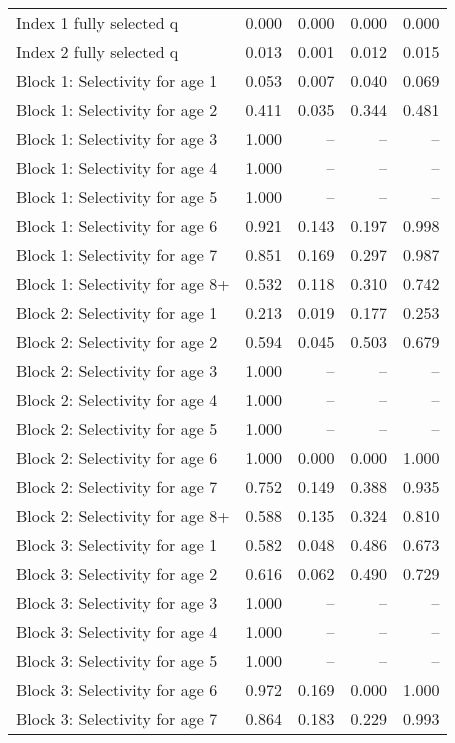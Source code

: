 \documentclass[
]{article}
\begin{document}
\begin{landscape}
\begin{longtable}[t]{lrrrr}
\endfoot
\bottomrule
\endlastfoot
Index 1 fully selected q & 0.000 & 0.000 & 0.000 & 0.000\\
Index 2 fully selected q & 0.013 & 0.001 & 0.012 & 0.015\\
Block 1: Selectivity for age 1 & 0.053 & 0.007 & 0.040 & 0.069\\
Block 1: Selectivity for age 2 & 0.411 & 0.035 & 0.344 & 0.481\\
Block 1: Selectivity for age 3 & 1.000 & -- & -- & --\\
\addlinespace
Block 1: Selectivity for age 4 & 1.000 & -- & -- & --\\
Block 1: Selectivity for age 5 & 1.000 & -- & -- & --\\
Block 1: Selectivity for age 6 & 0.921 & 0.143 & 0.197 & 0.998\\
Block 1: Selectivity for age 7 & 0.851 & 0.169 & 0.297 & 0.987\\
Block 1: Selectivity for age 8+ & 0.532 & 0.118 & 0.310 & 0.742\\
\addlinespace
Block 2: Selectivity for age 1 & 0.213 & 0.019 & 0.177 & 0.253\\
Block 2: Selectivity for age 2 & 0.594 & 0.045 & 0.503 & 0.679\\
Block 2: Selectivity for age 3 & 1.000 & -- & -- & --\\
Block 2: Selectivity for age 4 & 1.000 & -- & -- & --\\
Block 2: Selectivity for age 5 & 1.000 & -- & -- & --\\
\addlinespace
Block 2: Selectivity for age 6 & 1.000 & 0.000 & 0.000 & 1.000\\
Block 2: Selectivity for age 7 & 0.752 & 0.149 & 0.388 & 0.935\\
Block 2: Selectivity for age 8+ & 0.588 & 0.135 & 0.324 & 0.810\\
Block 3: Selectivity for age 1 & 0.582 & 0.048 & 0.486 & 0.673\\
Block 3: Selectivity for age 2 & 0.616 & 0.062 & 0.490 & 0.729\\
\addlinespace
Block 3: Selectivity for age 3 & 1.000 & -- & -- & --\\
Block 3: Selectivity for age 4 & 1.000 & -- & -- & --\\
Block 3: Selectivity for age 5 & 1.000 & -- & -- & --\\
Block 3: Selectivity for age 6 & 0.972 & 0.169 & 0.000 & 1.000\\
Block 3: Selectivity for age 7 & 0.864 & 0.183 & 0.229 & 0.993\\

\end{longtable}
\end{landscape}
\end{document}
